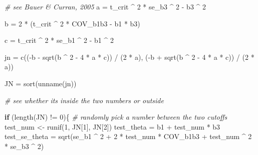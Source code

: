 \documentclass[
]{book}
\newenvironment{Shaded}{\begin{snugshade}}{\end{snugshade}}
\newcommand{\CommentTok}[1]{\textcolor[rgb]{0.56,0.35,0.01}{\textit{#1}}}
\newcommand{\ControlFlowTok}[1]{\textcolor[rgb]{0.13,0.29,0.53}{\textbf{#1}}}
\newcommand{\DecValTok}[1]{\textcolor[rgb]{0.00,0.00,0.81}{#1}}
\newcommand{\FunctionTok}[1]{\textcolor[rgb]{0.00,0.00,0.00}{#1}}
\newcommand{\NormalTok}[1]{#1}
\newcommand{\OtherTok}[1]{\textcolor[rgb]{0.56,0.35,0.01}{#1}}
\newcommand{\SpecialCharTok}[1]{\textcolor[rgb]{0.00,0.00,0.00}{#1}}
\begin{document}
\begin{Shaded}
\begin{Highlighting}[]
    
    \CommentTok{\# see Bauer \& Curran, 2005}
\NormalTok{    a }\OtherTok{=}\NormalTok{ t\_crit }\SpecialCharTok{\^{}} \DecValTok{2} \SpecialCharTok{*}\NormalTok{ se\_b3 }\SpecialCharTok{\^{}} \DecValTok{2} \SpecialCharTok{{-}}\NormalTok{ b3 }\SpecialCharTok{\^{}} \DecValTok{2}
    
\NormalTok{    b }\OtherTok{=} \DecValTok{2} \SpecialCharTok{*}\NormalTok{ (t\_crit }\SpecialCharTok{\^{}} \DecValTok{2} \SpecialCharTok{*}\NormalTok{ COV\_b1b3 }\SpecialCharTok{{-}}\NormalTok{ b1 }\SpecialCharTok{*}\NormalTok{ b3)}
    
\NormalTok{    c }\OtherTok{=}\NormalTok{ t\_crit }\SpecialCharTok{\^{}} \DecValTok{2} \SpecialCharTok{*}\NormalTok{ se\_b1 }\SpecialCharTok{\^{}} \DecValTok{2} \SpecialCharTok{{-}}\NormalTok{ b1 }\SpecialCharTok{\^{}} \DecValTok{2}
    
\NormalTok{    jn }\OtherTok{=} \FunctionTok{c}\NormalTok{((}\SpecialCharTok{{-}}\NormalTok{b }\SpecialCharTok{{-}} \FunctionTok{sqrt}\NormalTok{(b }\SpecialCharTok{\^{}} \DecValTok{2} \SpecialCharTok{{-}} \DecValTok{4} \SpecialCharTok{*}\NormalTok{ a }\SpecialCharTok{*}\NormalTok{ c)) }\SpecialCharTok{/}\NormalTok{ (}\DecValTok{2} \SpecialCharTok{*}\NormalTok{ a),}
\NormalTok{           (}\SpecialCharTok{{-}}\NormalTok{b }\SpecialCharTok{+} \FunctionTok{sqrt}\NormalTok{(b }\SpecialCharTok{\^{}} \DecValTok{2} \SpecialCharTok{{-}} \DecValTok{4} \SpecialCharTok{*}\NormalTok{ a }\SpecialCharTok{*}\NormalTok{ c)) }\SpecialCharTok{/}\NormalTok{ (}\DecValTok{2} \SpecialCharTok{*}\NormalTok{ a))}
    
\NormalTok{    JN }\OtherTok{=} \FunctionTok{sort}\NormalTok{(}\FunctionTok{unname}\NormalTok{(jn))}
    
    \CommentTok{\# see whether it\textquotesingle{}s inside the two numbers or outside}
    
    \ControlFlowTok{if}\NormalTok{ (}\FunctionTok{length}\NormalTok{(JN) }\SpecialCharTok{!=} \DecValTok{0}\NormalTok{)\{}
        \CommentTok{\# randomly pick a number between the two cutoffs}
\NormalTok{        test\_num }\OtherTok{\textless{}{-}} \FunctionTok{runif}\NormalTok{(}\DecValTok{1}\NormalTok{, JN[}\DecValTok{1}\NormalTok{], JN[}\DecValTok{2}\NormalTok{])}
\NormalTok{        test\_theta }\OtherTok{=}\NormalTok{ b1 }\SpecialCharTok{+}\NormalTok{ test\_num }\SpecialCharTok{*}\NormalTok{ b3}
\NormalTok{        test\_se\_theta }\OtherTok{=} \FunctionTok{sqrt}\NormalTok{(se\_b1 }\SpecialCharTok{\^{}} \DecValTok{2} \SpecialCharTok{+} \DecValTok{2} \SpecialCharTok{*}\NormalTok{ test\_num }\SpecialCharTok{*}\NormalTok{ COV\_b1b3 }\SpecialCharTok{+}\NormalTok{ test\_num }\SpecialCharTok{\^{}} \DecValTok{2} \SpecialCharTok{*}\NormalTok{ se\_b3 }\SpecialCharTok{\^{}} \DecValTok{2}\NormalTok{)}
        

\end{Highlighting}
\end{Shaded}
\end{document}
